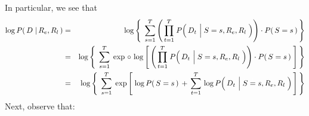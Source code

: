In particular, we see that
\begin{eqnarray*}
\log P\!\left(\,D \;\vert\, R_{e},R_{l}\,\right)
&=&
	\log\left\{\;\,
		\overset{T}{\underset{s=1}{\sum}}
		\left(\,
			\overset{T}{\underset{t=1}{\prod}}\;
			P\!\left(\,D_{t} \,\left\vert\; S\overset{{\color{white}1}}{=}s,R_{e},R_{l}\right.\,\right)
			\right)
		\cdot
		P\!\left(\,S=s\,\right)
		\,\right\}
\\
& = &
	\log\left\{\;\,
	\overset{T}{\underset{s=1}{\sum}}\;
	\exp\,\circ\,\log\left[\,
		\left(\,
			\overset{T}{\underset{t=1}{\prod}}\;
			P\!\left(\,D_{t} \,\left\vert\; S\overset{{\color{white}1}}{=}s,R_{e},R_{l}\right.\,\right)
			\right)
		\cdot
		P\!\left(\,S=s\,\right)
		\;\right]
	\,\right\}
\\
& = &
	\log\left\{\;\,
	\overset{T}{\underset{s=1}{\sum}}\;
	\exp\left[\;\log P\!\left(\,S=s\,\right)
			\, + \,
			\overset{T}{\underset{t=1}{\sum}}\,
				\log P\!\left(\,D_{t} \,\left\vert\; S\overset{{\color{white}1}}{=}s,R_{e},R_{l}\right.\,\right)
		\,\right]
	\,\right\}
\end{eqnarray*}
Next, observe that:
